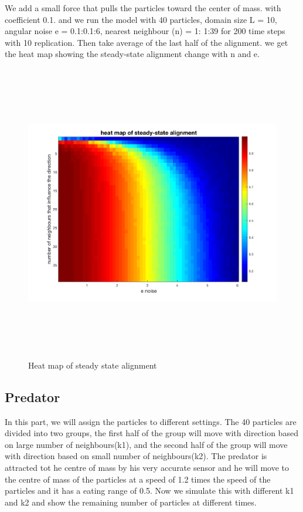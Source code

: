 \documentclass[12pt]{article}
\begin{document}
We add a small force that pulls the particles toward the center of mass. with coefficient 0.1. and we run the model with 40 particles, domain size L = 10, angular noise e = 0.1:0.1:6, nearest neighbour (n) = 1: 1:39 for 200 time steps with 10 replication. Then take average of the last half of the alignment. we get the heat map showing the steady-state alignment change with n and e.
\begin{figure}[H] %
\centering
\includegraphics[width = 16 cm, height = 13cm]{heatmap.png}
\caption{Heat map of steady state alignment}
\label{fig:hm}
\end{figure}


\subsection{Predator}

In this part, we will assign the particles to different settings. The 40 particles are divided into two groups, the first half of the group will move with direction based on large number of neighbours(k1), and the second half of the group will move with direction based on small number of neighbours(k2). The predator is attracted tot he centre of mass by his very accurate sensor and he will move to the centre of mass of the particles at a speed of 1.2 times the speed of the particles and it has a eating range of 0.5. Now we simulate this with different k1 and k2 and show the remaining number of particles at different times. \par
\end{document}
